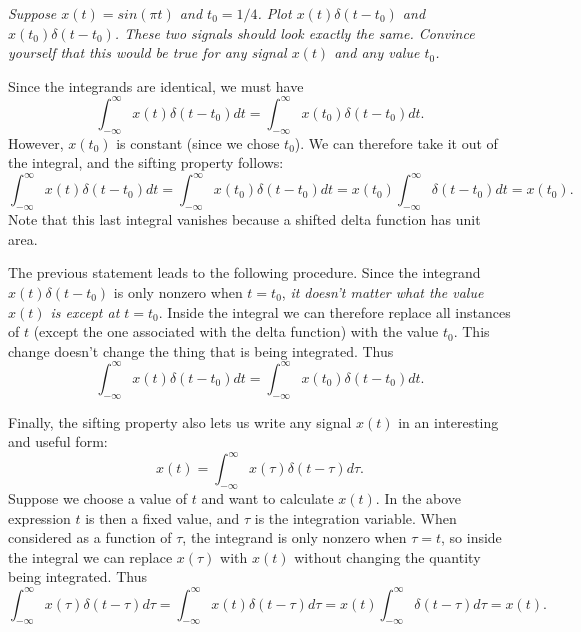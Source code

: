 \documentclass[10pt]{beamer}
\begin{document}
{\em Suppose $x(t) = sin(\pi t)$ and $t_0 = 1/4$.  Plot $x(t) \delta(t-t_0)$ and $x(t_0) \delta(t - t_0)$.  These two signals should look {\em exactly} the same.  Convince yourself that this would be true for {\em any} signal $x(t)$ and {\em any} value $t_0$.}

Since the integrands are identical, we must have
\begin{equation*}
  \int_{-\infty}^{\infty} x(t) \delta(t-t_0) dt = \int_{-\infty}^{\infty} x(t_0) \delta(t - t_0) dt.
\end{equation*}
However, $x(t_0)$ is constant (since we chose $t_0$).  We can therefore take it out of the integral, and the sifting property follows:
\begin{equation*}
  \int_{-\infty}^{\infty} x(t) \delta(t-t_0) dt = \int_{-\infty}^{\infty} x(t_0) \delta(t - t_0) dt
  = x(t_0) \int_{-\infty}^{\infty} \delta(t - t_0) dt = x(t_0).
\end{equation*}
Note that this last integral vanishes because a shifted delta function has unit area.

The previous statement leads to the following procedure.  Since the integrand $x(t) \delta(t-t_0)$ is only nonzero when $t = t_0$, {\em it doesn't matter what the value $x(t)$ is except at $t=t_0$}.  Inside the integral we can therefore replace all instances of $t$ (except the one associated with the delta function) with the value $t_0$.  This change doesn't change the thing that is being integrated.  Thus
\begin{equation*}
  \int_{-\infty}^{\infty} x(t) \delta(t-t_0) dt = \int_{-\infty}^{\infty} x(t_0) \delta(t-t_0) dt.
\end{equation*}

Finally, the sifting property also lets us write any signal $x(t)$ in an interesting and useful form:
\begin{equation*}
  x(t) = \int_{-\infty}^{\infty} x(\tau) \delta(t - \tau) d\tau.
\end{equation*}
Suppose we choose a value of $t$ and want to calculate $x(t)$.  In the above expression $t$ is then a fixed value, and $\tau$ is the integration variable.  When considered as a function of $\tau$, the integrand is only nonzero when $\tau = t$, so inside the integral we can replace $x(\tau)$ with $x(t)$ without changing the quantity being integrated.  Thus
\begin{equation*}
  \int_{-\infty}^{\infty} x(\tau) \delta(t - \tau) d\tau = \int_{-\infty}^{\infty} x(t) \delta(t - \tau) d\tau
  = x(t) \int_{-\infty}^{\infty} \delta(t - \tau) d\tau = x(t).
\end{equation*}
\end{document}
